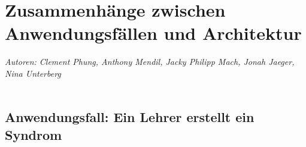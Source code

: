 \documentclass[enabledeprecatedfontcommands,fontsize=11pt,paper=a4,twoside]{scrartcl}
\begin{document}
\newpage
\section[Zusammenhänge zwischen Anwendungsfällen und Architektur]{Zusammenhänge zwischen Anwendungsfällen und Architektur}
\label{sec:anwendungsfaelle}
\emph{Autoren: Clement Phung, Anthony Mendil, Jacky Philipp Mach, Jonah Jaeger, Nina Unterberg}\\ \\

\subsection{Anwendungsfall: Ein Lehrer erstellt ein Syndrom}
\end{document}
